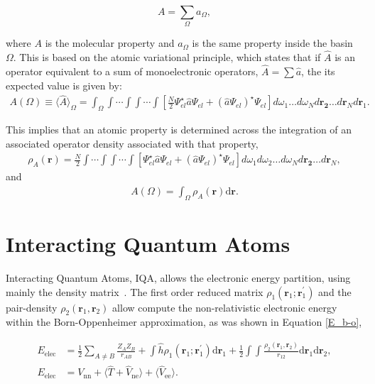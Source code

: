 \begin{equation}
A = \sum_{\Omega}{a_{\Omega}},
\label{promoleculares}
\end{equation}

\noindent where $A$ is the molecular property and $a_{\Omega}$ is the same
property inside the basin $\Omega$. This is based on the atomic variational
principle, which states that if $\hat{A}$ is an operator equivalent to a sum
of monoelectronic operators, $\hat{A}=\sum\hat{a}$, the its expected value is
given by:
\begin{align}
A(\Omega) \equiv \langle\widehat{A}\rangle_{\Omega} = \int_{\Omega}\int\cdots\int\int\cdots\int
\left [ \frac{N}{2}\Psi_{el}^{\star}\hat{a}\Psi_{el} + (\hat{a}\Psi_{el})^{\star}\Psi_{el}\right ]
d\omega_{1}\ldots d\omega_{N}d\mathbf{r_2}\ldots d\mathbf{r}_{N}d\mathbf{r}_{1} .
\end{align}

This implies that an atomic property is determined across the integration of
an associated operator density associated with that property,
\begin{align}
\rho_{A}(\mathbf{r})=\frac{N}{2}\int\cdots\int\int\cdots\int[
\Psi_{el}^{\star}\hat{a}\Psi_{el} + (\hat{a}\Psi_{el})^{\star}\Psi_{el}]
d\omega_{1}d\omega_{2}\ldots d\omega_{N}d\mathbf{r_2}\ldots d\mathbf{r}_N ,
\end{align}
and
\begin{align}
A(\Omega)=\int_{\Omega}\rho_{A}(\mathbf{r})\mathrm{d}\mathbf{r} .
\end{align}


\section{Interacting Quantum Atoms}\label{IQAtheory}

Interacting Quantum Atoms, \gls{IQA}, allows the electronic energy partition,
using mainly the density matrix~\cite{Blanco2005, mcweeny}. The
first order reduced matrix $\rho_1(\mathbf{r}_1;\mathbf{r}_1^{\prime})$ and
the pair-density $\rho_2(\mathbf{r}_1,\mathbf{r}_2)$ allow compute the
non-relativistic electronic energy within the Born-Oppenheimer approximation,
as was shown in Equation \ref{E_b-o},

\begin{align}
E_{\mathrm{elec}} & = \frac{1}{2} \sum_{A \neq B} \frac{Z_A Z_B}{r_{AB}} 
+ \int \widehat{h} \rho_1(\mathbf{r}_1;\mathbf{r}_1^{\prime}) \mathrm{d} \mathbf{r}_1 
+ \frac{1}{2} \int \int \frac{\rho_2(\mathbf{r}_1,\mathbf{r}_2)}{r_{12}} 
\mathrm{d} \mathbf{r}_1 \mathrm{d} \mathbf{r}_2, \label{base}\\
E_{\mathrm{elec}} & = V_{\mathrm{nn}}
+ \langle \widehat{T} + \widehat{V}_{\mathrm{ne}} \rangle 
+ \langle \widehat{V}_{\mathrm{ee}} \rangle.
\end{align}


